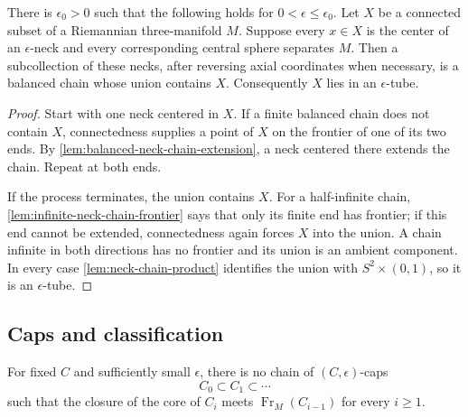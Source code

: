 \begin{theorem}
\label{thm:separating-neck-centers-form-tube}
\notready
There is $\epsilon_0>0$ such that the following holds for
$0<\epsilon\le\epsilon_0$.  Let $X$ be a connected subset of a Riemannian
three-manifold $M$.  Suppose every $x\in X$ is the center of an
$\epsilon$-neck and every corresponding central sphere separates $M$.
Then a subcollection of these necks, after reversing axial coordinates when
necessary, is a balanced chain whose union contains $X$.  Consequently
$X$ lies in an $\epsilon$-tube.
\end{theorem}

\begin{proof}
Start with one neck centered in $X$.  If a finite balanced chain does not
contain $X$, connectedness supplies a point of $X$ on the frontier of one
of its two ends.  By \ref{lem:balanced-neck-chain-extension}, a neck
centered there extends the chain.  Repeat at both ends.

If the process terminates, the union contains $X$.  For a half-infinite
chain, \ref{lem:infinite-neck-chain-frontier} says that only its finite end
has frontier; if this end cannot be extended, connectedness again forces
$X$ into the union.  A chain infinite in both directions has no frontier
and its union is an ambient component.  In every case
\ref{lem:neck-chain-product} identifies the union with
$S^2\times(0,1)$, so it is an $\epsilon$-tube.
\end{proof}

\subsection{Caps and classification}

\begin{lemma}
\label{lem:no-infinite-nested-canonical-caps}
\notready
For fixed $C$ and sufficiently small $\epsilon$, there is no chain of
$(C,\epsilon)$-caps
\[
 C_0\subset C_1\subset\cdots
\]
such that the closure of the core of $C_i$ meets
$\operatorname{Fr}_M(C_{i-1})$ for every $i\ge1$.
\end{lemma}

